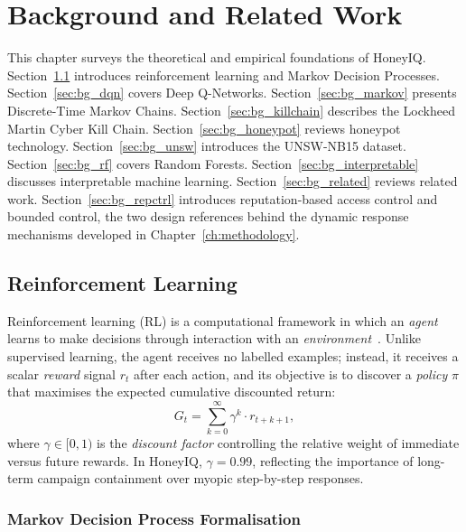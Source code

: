 \chapter{Background and Related Work}
\label{ch:background}

This chapter surveys the theoretical and empirical foundations of HoneyIQ.
Section~\ref{sec:bg_rl} introduces reinforcement learning and Markov Decision
Processes.
Section~\ref{sec:bg_dqn} covers Deep Q-Networks.
Section~\ref{sec:bg_markov} presents Discrete-Time Markov Chains.
Section~\ref{sec:bg_killchain} describes the Lockheed Martin Cyber Kill Chain.
Section~\ref{sec:bg_honeypot} reviews honeypot technology.
Section~\ref{sec:bg_unsw} introduces the UNSW-NB15 dataset.
Section~\ref{sec:bg_rf} covers Random Forests.
Section~\ref{sec:bg_interpretable} discusses interpretable machine learning.
Section~\ref{sec:bg_related} reviews related work.
Section~\ref{sec:bg_repctrl} introduces reputation-based access control and
bounded control, the two design references behind the dynamic response
mechanisms developed in Chapter~\ref{ch:methodology}.

\section{Reinforcement Learning}
\label{sec:bg_rl}

Reinforcement learning (RL) is a computational framework in which an
\emph{agent} learns to make decisions through interaction with an
\emph{environment}~\citep{sutton2018reinforcement}.
Unlike supervised learning, the agent receives no labelled examples; instead,
it receives a scalar \emph{reward} signal $r_t$ after each action, and its
objective is to discover a \emph{policy} $\pi$ that maximises the expected
cumulative discounted return:
%
\begin{equation}
  G_t = \sum_{k=0}^{\infty} \gamma^k \cdot r_{t+k+1},
  \label{eq:return}
\end{equation}
%
where $\gamma \in [0, 1)$ is the \emph{discount factor} controlling the
relative weight of immediate versus future rewards.
In HoneyIQ, $\gamma = 0.99$, reflecting the importance of long-term campaign
containment over myopic step-by-step responses.

\subsection{Markov Decision Process Formalisation}
\label{sec:mdp}

